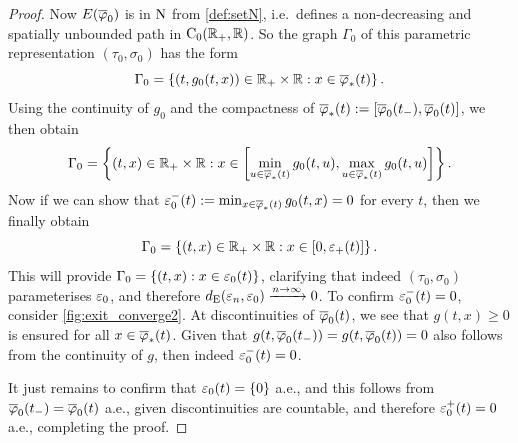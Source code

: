 \begin{proof}
    Now $E(\overline{\varphi}_0)$ is in $\mathrm{N}$ from \autoref{def:setN}, i.e.~defines a non-decreasing and spatially unbounded path in $\mathrm{C}_0(\mathbb{R}_+,\mathbb{R})$. So the graph $\Gamma_0$ of this parametric representation $(\tau_0,\sigma_0)$ has the form
    \begin{equation}\label{eq:graph_rep}
        \Gamma_0 = \left\{(t,g_0(t,x))\in\mathbb{R}_+\times\mathbb{R}: x\in\overline{\varphi}_*(t)\right\}.
    \end{equation}
    Using the continuity of $g_0$ and the compactness of $\overline{\varphi}_*(t):=[\overline{\varphi}_0(t_-),\overline{\varphi}_0(t)]$, we then obtain
    \begin{equation}
        \Gamma_0 = \left\{(t,x)\in\mathbb{R}_+\times\mathbb{R}: x\in\left[\min_{u\in\overline{\varphi}_*(t)} g_0(t,u),\max_{u\in\overline{\varphi}_*(t)} g_0(t,u)\right]\right\}.
    \end{equation}
    Now if we can show that $\varepsilon^-_0(t):=\min_{x\in\overline{\varphi}_*(t)} g_0(t,x)=0$ for every $t$, then we finally obtain
    \begin{equation}
        \Gamma_0 = \left\{(t,x)\in\mathbb{R}_+\times\mathbb{R}: x\in\left[0,\varepsilon_+(t)\right]\right\}.
    \end{equation}
    This will provide $\Gamma_0=\{(t,x):x\in\varepsilon_0(t)\}$, clarifying that indeed $(\tau_0,\sigma_0)$ parameterises $\varepsilon_0$, and therefore $d_{\mathrm{E}}(\varepsilon_n,\varepsilon_0)\xrightarrow{n\to\infty}0$. To confirm $\varepsilon^-_0(t)=0$, consider \autoref{fig:exit_converge2}. At discontinuities of $\overline{\varphi}_0(t)$, we see that $g(t,x)\ge0$ is ensured for all $x\in\overline{\varphi}_*(t)$. Given that $g(t,\overline{\varphi}_0(t_-))=g(t,\overline{\varphi}_0(t)) = 0$ also follows from the continuity of $g$, then indeed $\varepsilon^-_0(t)=0$.

    It just remains to confirm that $\varepsilon_0(t)=\{0\}$ a.e., and this follows from $\overline{\varphi}_0(t_-)=\overline{\varphi}_0(t)$ a.e., given discontinuities are countable, and therefore $\varepsilon^+_0(t)=0$ a.e., completing the proof.
\end{proof}

